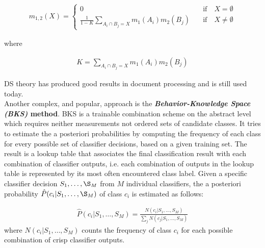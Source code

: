 \documentclass[]{article}
\begin{document}
			\begin{align*}
				m_{1,2}(X) = 
				\begin{cases}
					0 \quad &\text{if} \quad X = \emptyset \\
					\frac{1}{1-K} \sum_{A_{i} \cap B_{j} = X}m_{1}(A_{i})m_{2}(B_{j}) \quad &\text{if} \quad X \neq \emptyset
				\end{cases}
			\end{align*}
			
			\noindent
			where
			
			\begin{align*}
				K = \sum_{A_{i} \cap B_{j} = X}m_{1}(A_{i})m_{2}(B_{j})
			\end{align*}
			
			\noindent
			DS theory has produced good results in document processing and is still used today.  \\
			Another complex, and popular, approach is the \textbf{\textit{Behavior-Knowledge Space (BKS)} method}.  BKS is a trainable combination scheme on the abstract level which requires neither measurements not ordered sets of candidate classes.  It tries to estimate the a posteriori probabilities by computing the frequency of each class for every possible set of classifier decisions, based on a given training set.  The result is a lookup table that associates the final classification result with each combination of classifier outputs, i.e. each combination of outputs in the lookup table is represented by its most often encountered class label.  Given a specific classifier decision $S_1, \dots, \S_M$ from $M$ individual classifiers, the a posteriori probability $\hat{P}(c_i|S_1, \dots, \S_M)$ of class $c_i$ is estimated as follows:
			
			\begin{align*}
				\hat{P}(c_i|S_1, \dots, S_M) = \frac{N(c_i|S_1, \dots, S_M)}{\sum_{j}  N(c_j|S_1, \dots, S_M)}
			\end{align*}
			\noindent
			where $N(c_i|S_1, \dots, S_M)$ counts the frequency of class $c_i$ for each possible combination of crisp classifier outputs. \\
			
\end{document}
